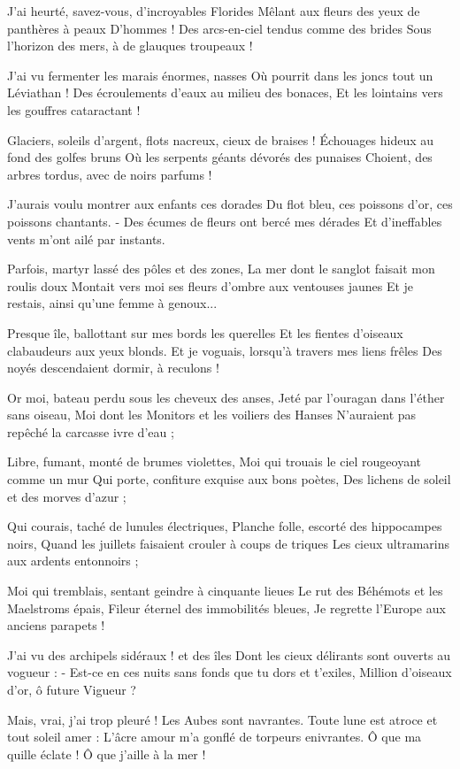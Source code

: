 J'ai heurté, savez-vous, d'incroyables Florides
Mêlant aux fleurs des yeux de panthères à peaux
D'hommes ! Des arcs-en-ciel tendus comme des brides
Sous l'horizon des mers, à de glauques troupeaux !

J'ai vu fermenter les marais énormes, nasses
Où pourrit dans les joncs tout un Léviathan !
Des écroulements d'eaux au milieu des bonaces,
Et les lointains vers les gouffres cataractant !

Glaciers, soleils d'argent, flots nacreux, cieux de braises !
Échouages hideux au fond des golfes bruns
Où les serpents géants dévorés des punaises
Choient, des arbres tordus, avec de noirs parfums !

J'aurais voulu montrer aux enfants ces dorades
Du flot bleu, ces poissons d'or, ces poissons chantants.
- Des écumes de fleurs ont bercé mes dérades
Et d'ineffables vents m'ont ailé par instants.

Parfois, martyr lassé des pôles et des zones,
La mer dont le sanglot faisait mon roulis doux
Montait vers moi ses fleurs d'ombre aux ventouses jaunes
Et je restais, ainsi qu'une femme à genoux...

Presque île, ballottant sur mes bords les querelles
Et les fientes d'oiseaux clabaudeurs aux yeux blonds.
Et je voguais, lorsqu'à travers mes liens frêles
Des noyés descendaient dormir, à reculons !

Or moi, bateau perdu sous les cheveux des anses,
Jeté par l'ouragan dans l'éther sans oiseau,
Moi dont les Monitors et les voiliers des Hanses
N'auraient pas repêché la carcasse ivre d'eau ;

Libre, fumant, monté de brumes violettes,
Moi qui trouais le ciel rougeoyant comme un mur
Qui porte, confiture exquise aux bons poètes,
Des lichens de soleil et des morves d'azur ;

Qui courais, taché de lunules électriques,
Planche folle, escorté des hippocampes noirs,
Quand les juillets faisaient crouler à coups de triques
Les cieux ultramarins aux ardents entonnoirs ;

Moi qui tremblais, sentant geindre à cinquante lieues
Le rut des Béhémots et les Maelstroms épais,
Fileur éternel des immobilités bleues,
Je regrette l'Europe aux anciens parapets !

J'ai vu des archipels sidéraux ! et des îles
Dont les cieux délirants sont ouverts au vogueur :
- Est-ce en ces nuits sans fonds que tu dors et t'exiles,
Million d'oiseaux d'or, ô future Vigueur ?

Mais, vrai, j'ai trop pleuré ! Les Aubes sont navrantes.
Toute lune est atroce et tout soleil amer :
L'âcre amour m'a gonflé de torpeurs enivrantes.
Ô que ma quille éclate ! Ô que j'aille à la mer !

